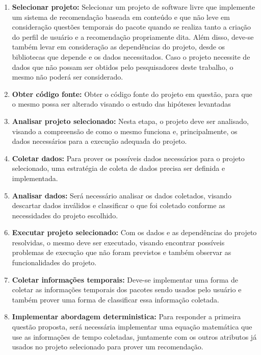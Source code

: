 \begin{enumerate}

    \item \textbf{Selecionar projeto:}
Selecionar um projeto de software livre que implemente um sistema de recomendação baseada em conteúdo e que não leve em consideração questões temporais do pacote quando se realiza tanto
a criação do perfil de usuário e a recomendação propriamente dita. Além disso, deve-se também levar em consideração as dependências do projeto, desde os bibliotecas que depende e os
dados necessitados. Caso o projeto necessite de dados que não possam ser obtidos pelo pesquisadores deste trabalho, o mesmo não poderá ser considerado.

    \item \textbf{Obter código fonte:}
Obter o código fonte do projeto em questão, para que o mesmo possa ser alterado visando o estudo das hipóteses levantadas

    \item \textbf{Analisar projeto selecionado:}
Nesta etapa, o projeto deve ser analisado, visando a compreensão de como o mesmo funciona e, principalmente, os dados necessários para a execução adequada do projeto.

    \item \textbf{Coletar dados:}
Para prover os possíveis dados necessários para o projeto selecionado, uma estratégia de coleta de dados precisa ser definida e implementada.

    \item \textbf{Analisar dados:}
Será necessário analisar os dados coletados, visando descartar dados inválidos e classificar o que foi coletado conforme as necessidades do projeto escolhido.

    \item \textbf{Executar projeto selecionado:}
Com os dados e as dependências do projeto resolvidas, o mesmo deve ser executado, visando encontrar possíveis problemas de execução que não foram previstos e também observar as funcionalidades do projeto.

    \item \textbf{Coletar informações temporais:}
Deve-se implementar uma forma de coletar as informações temporais dos pacotes sendo usados pelo usuário e também prover uma forma de classificar essa informação coletada.

    \item \textbf{Implementar abordagem deterministica:}
Para responder a primeira questão proposta, será necessária implementar uma equação matemática que use as informações de tempo coletadas, juntamente com os outros atributos já usados no projeto selecionado para prover um recomendação.


\end{enumerate}
